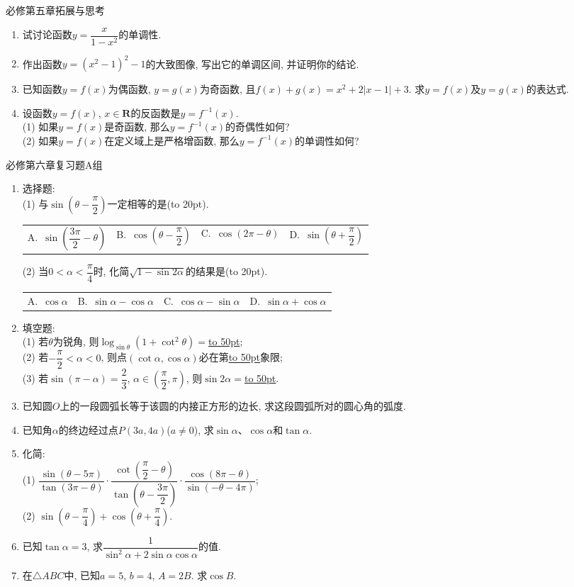 \documentclass[10pt,a4paper]{article}
\newcommand{\blank}[1]{\underline{\hbox to #1pt{}}}
\newcommand{\bracket}[1]{(\hbox to #1pt{})}
\newcommand{\fourch}[4]{\par\begin{tabular}{p{.23\textwidth}p{.23\textwidth}p{.23\textwidth}p{.23\textwidth}}
A.~#1 &B.~#2& C.~#3& D.~#4
\end{tabular}}
\begin{document}
必修第五章拓展与思考
\begin{enumerate}[1.]
\item 试讨论函数$y=\dfrac{x}{1-x^2}$的单调性.
\item 作出函数$y=(x^2-1)^2-1$的大致图像, 写出它的单调区间, 并证明你的结论.
\item 已知函数$y=f(x)$为偶函数, $y=g(x)$为奇函数, 且$f(x)+g(x)=x^2+2|x-1|+3$. 求$y=f(x)$及$y=g(x)$的表达式.
\item 设函数$y=f(x)$, $x\in \mathbf{R}$的反函数是$y=f^{-1}(x)$.\\
(1) 如果$y=f(x)$是奇函数, 那么$y=f^{-1}(x)$的奇偶性如何?\\
(2) 如果$y=f(x)$在定义域上是严格增函数, 那么$y=f^{-1}(x)$的单调性如何?
\end{enumerate}

必修第六章复习题A组
\begin{enumerate}[1.]
\item 选择题:\\
(1) 与$\sin(\theta -\dfrac\pi 2)$一定相等的是\bracket{20}.
\fourch{$\sin(\dfrac{3\pi}2-\theta)$}{$\cos(\theta -\dfrac{\pi}2)$}{$\cos (2\pi -\theta)$}{$\sin (\theta +\dfrac\pi 2)$}
(2) 当$0<\alpha<\dfrac\pi 4$时, 化简$\sqrt{1-\sin 2\alpha}$的结果是\bracket{20}.
\fourch{$\cos \alpha$}{$\sin \alpha-\cos \alpha$}{$\cos\alpha-\sin\alpha$}{$\sin\alpha+\cos\alpha$}
\item 填空题:\\
(1) 若$\theta$为锐角, 则$\log_{\sin \theta} (1+\cot^2\theta)=$\blank{50};\\
(2) 若$-\dfrac\pi 2<\alpha<0$, 则点$(\cot \alpha, \cos \alpha)$必在第\blank{50}象限;\\
(3) 若$\sin (\pi -\alpha)=\dfrac 23$, $\alpha\in (\dfrac\pi 2, \pi)$, 则$\sin 2\alpha=$\blank{50}.
\item 已知圆$O$上的一段圆弧长等于该圆的内接正方形的边长, 求这段圆弧所对的圆心角的弧度.
\item 已知角$\alpha$的终边经过点$P(3a, 4a)$($a\ne 0$), 求$\sin \alpha$、$\cos \alpha$和$\tan \alpha$.
\item 化简:\\
(1) $\dfrac{\sin (\theta -5\pi )}{\tan (3\pi -\theta )}\cdot \dfrac{\cot (\dfrac\pi 2-\theta )}{\tan (\theta -\dfrac{3\pi} 2)}\cdot \dfrac{\cos (8\pi -\theta )}{\sin(-\theta-4\pi)}$;\\
(2) $\sin (\theta -\dfrac\pi 4)+\cos (\theta +\dfrac\pi 4)$.
\item 已知$\tan \alpha=3$, 求$\dfrac 1{\sin^2\alpha+2\sin \alpha\cos \alpha}$的值.
\item 在$\triangle ABC$中, 已知$a=5$, $b=4$, $A=2B$. 求$\cos B$.

\end{enumerate}
\end{document}

